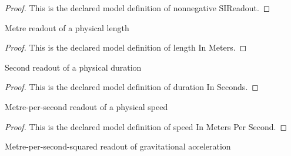 \begin{proof}
  This is the declared model definition of nonnegative SIReadout.
\end{proof}
\begin{definition}
  \label{def:physics:phyx-mini-0693:phyxminiproblems-problemphyxmini0693-lengthinmeters}
  Metre readout of a physical length
\end{definition}
\begin{proof}
  This is the declared model definition of length In Meters.
\end{proof}
\begin{definition}
  \label{def:physics:phyx-mini-0693:phyxminiproblems-problemphyxmini0693-durationinseconds}
  Second readout of a physical duration
\end{definition}
\begin{proof}
  This is the declared model definition of duration In Seconds.
\end{proof}
\begin{definition}
  \label{def:physics:phyx-mini-0693:phyxminiproblems-problemphyxmini0693-speedinmeterspersecond}
  Metre-per-second readout of a physical speed
\end{definition}
\begin{proof}
  This is the declared model definition of speed In Meters Per Second.
\end{proof}
\begin{definition}
  \label{def:physics:phyx-mini-0693:phyxminiproblems-problemphyxmini0693-accelerationinmeterspersecondsquared}
  Metre-per-second-squared readout of gravitational acceleration
\end{definition}
